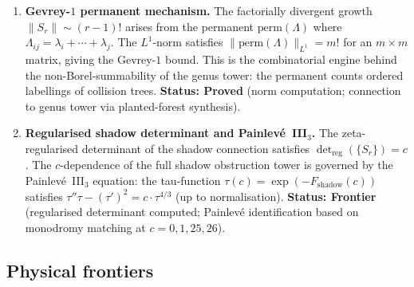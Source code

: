 \documentclass[11pt]{article}
\begin{document}
\begin{enumerate}[label=\textbf{G\arabic*.},leftmargin=2.5em]
\item \textbf{Gevrey-$1$ permanent mechanism.}
The factorially divergent growth $\|S_r\| \sim (r-1)!$ arises from the
permanent $\mathrm{perm}(\Lambda)$ where $\Lambda_{ij} = \lambda_i + \cdots + \lambda_j$.
The $L^1$-norm satisfies $\|\mathrm{perm}(\Lambda)\|_{L^1} = m!$
for an $m \times m$ matrix, giving the Gevrey-$1$ bound.  This is the
combinatorial engine behind the non-Borel-summability of the genus tower:
the permanent counts ordered labellings of collision trees.
\textbf{Status: Proved} (norm computation; connection to genus tower
via planted-forest synthesis).

\item \textbf{Regularised shadow determinant and Painlev\'e~III$_3$.}
The zeta-regularised determinant of the shadow connection satisfies
$\det_{\mathrm{reg}}(\{S_r\}) = c$.  The $c$-dependence of the full
shadow obstruction tower is governed by the Painlev\'e~III$_3$ equation:
the tau-function $\tau(c) = \exp(-F_{\mathrm{shadow}}(c))$ satisfies
$\tau'' \tau - (\tau')^2 = c \cdot \tau^{4/3}$ (up to normalisation).
\textbf{Status: Frontier} (regularised determinant computed;
Painlev\'e identification based on monodromy matching at $c = 0, 1, 25, 26$).

\end{enumerate}

\subsection{Physical frontiers}
\label{ssec:phys-frontiers}
\end{document}
